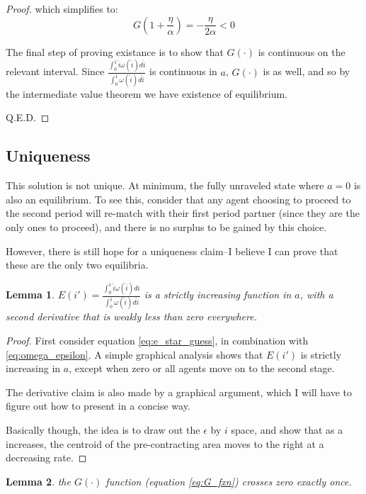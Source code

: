 \documentclass[WP]{AEA}
\newtheorem{lemma}{Lemma}
\begin{document}
\begin{proof}
which simplifies to:
\begin{equation} \label{eq:G_g_0}
G(1+\frac{\eta }{\alpha}) =-\frac{\eta}{ 2 \alpha } < 0 
\end{equation}


The final step of proving existance is to show that $G(\cdot)$ is continuous on the relevant interval. Since  $ \frac{\int_0^1 \hat{i} \omega(\hat{i}) d\hat{i}}{\int_0^1  \omega(\hat{i}) d\hat{i}} $ is continuous in $a$, $G(\cdot)$ is as well, and so by the intermediate value theorem we have existence of equilibrium.

Q.E.D.
\end{proof}

\subsection{Uniqueness}

This solution is not unique.  At minimum, the fully unraveled state where $a= 0$ is also an equilibrium.  To see this, consider that any agent choosing to proceed to the second period will re-match with their first period partner (since they are the only ones to proceed), and there is no surplus to be gained by this choice.

However, there is still hope for a uniqueness claim--I believe I can prove that these are the only two equilibria.

\begin{lemma}
	$ E(i') = \frac{\int_0^1 \hat{i} \omega(\hat{i}) di}{\int_0^1  \omega(\hat{i}) d\hat{i}}$ is a strictly increasing function in $a$, with a second derivative that is weakly less than zero everywhere.
	
\end{lemma}	

\begin{proof}
	First consider equation \ref{eq:e_star_guess}, in combination with \ref{eq:omega_epsilon}. A simple graphical analysis shows that $E(i')$ is strictly increasing in $a$, except when zero or all agents move on to the second stage.
	
	The derivative claim is also made by a graphical argument, which I will have to figure out how to present in a concise way.
	
	Basically though, the idea is to draw out the $\epsilon$ by $i$ space, and show that as a increases, the centroid of the pre-contracting area moves to the right at a decreasing rate. 
	
\end{proof}
\begin{lemma} \label{lemma:zero_crossing}
	the $G(\cdot)$ function (equation \ref{eq:G_fxn}) crosses zero exactly once.
\end{lemma}
\end{document}
